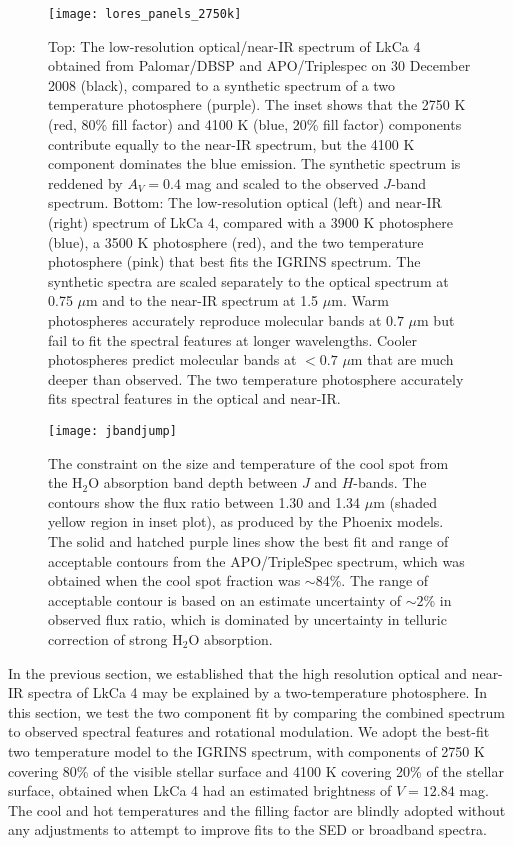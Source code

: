 \documentclass[twocolumn]{emulateapj}%
\begin{document}
\begin{figure*}
 \centering
 \texttt{[image: lores\_panels\_2750k]}
 \caption{Top:  The low-resolution optical/near-IR spectrum of LkCa 4 obtained from Palomar/DBSP and APO/Triplespec on 30 December 2008 (black), compared to a synthetic spectrum of a two temperature photosphere (purple).  The inset shows that the 2750 K (red, 80\% fill factor) and 4100 K (blue, 20\% fill factor) components contribute equally to the near-IR spectrum, but the 4100 K component dominates the blue emission.  The synthetic spectrum is reddened by $A_V=0.4$ mag and scaled to the observed $J$-band spectrum. Bottom:  The low-resolution optical (left) and near-IR (right) spectrum of LkCa 4, compared with a 3900 K photosphere (blue), a 3500 K photosphere (red), and the two temperature photosphere (pink) that best fits the IGRINS spectrum.  The synthetic spectra are scaled separately to the optical spectrum at 0.75 $\mu$m and to the near-IR spectrum at 1.5 $\mu$m.  Warm photospheres accurately reproduce molecular bands at $0.7$ $\mu$m but fail to fit the spectral features at longer wavelengths.  Cooler photospheres predict molecular bands at $<0.7$ $\mu$m that are much deeper than observed.  The two temperature photosphere accurately fits spectral features in the optical and near-IR.}
 \label{fig:lores}
\end{figure*}


\begin{figure}
 \centering
\texttt{[image: jbandjump]}
\caption{The constraint on the size and temperature of the cool spot from the H$_2$O absorption band depth between $J$ and $H$-bands.  The contours show the flux ratio between 1.30 and 1.34 $\mu$m (shaded yellow region in inset plot), as produced by the Phoenix models.  The solid and hatched purple lines show the best fit and range of acceptable contours from the APO/TripleSpec spectrum, which was obtained when the cool spot fraction was $\sim 84$\%.  The range of acceptable contour is based on an estimate uncertainty of $\sim 2$\% in observed flux ratio, which is dominated by uncertainty in telluric correction of strong H$_2$O absorption. }
 \label{fig:h2ojump}
\end{figure}


In the previous section, we established that the high resolution optical and near-IR spectra of LkCa 4 may be explained by a two-temperature photosphere.  In this section, we test the two component fit by comparing the combined spectrum to observed spectral features and rotational modulation.  We adopt the best-fit two temperature model to the IGRINS spectrum, with components of 2750 K covering 80\% of the visible stellar surface and 4100 K covering 20\% of the stellar surface, obtained when LkCa 4 had an estimated brightness of $V=12.84$ mag.  The cool and hot temperatures and the filling factor are blindly adopted without any adjustments to attempt to improve fits to the SED or broadband spectra.
\end{document}
